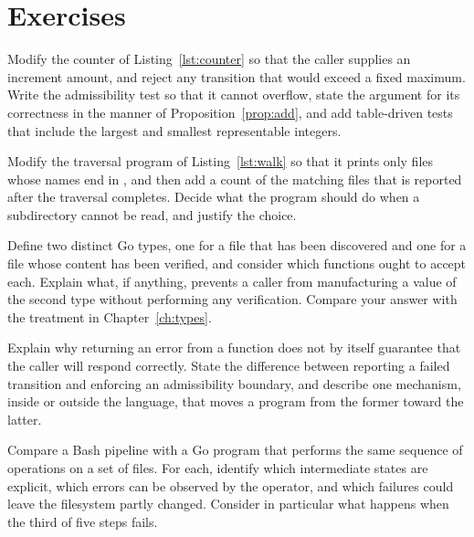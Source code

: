 \section*{Exercises}

\begin{exercise}
Modify the counter of Listing~\ref{lst:counter} so that the caller supplies an increment amount, and reject any transition that would exceed a fixed maximum. Write the admissibility test so that it cannot overflow, state the argument for its correctness in the manner of Proposition~\ref{prop:add}, and add table-driven tests that include the largest and smallest representable integers.
\end{exercise}

\begin{exercise}
Modify the traversal program of Listing~\ref{lst:walk} so that it prints only files whose names end in , and then add a count of the matching files that is reported after the traversal completes. Decide what the program should do when a subdirectory cannot be read, and justify the choice.
\end{exercise}

\begin{exercise}
Define two distinct Go types, one for a file that has been discovered and one for a file whose content has been verified, and consider which functions ought to accept each. Explain what, if anything, prevents a caller from manufacturing a value of the second type without performing any verification. Compare your answer with the treatment in Chapter~\ref{ch:types}.
\end{exercise}

\begin{exercise}
Explain why returning an error from a function does not by itself guarantee that the caller will respond correctly. State the difference between reporting a failed transition and enforcing an admissibility boundary, and describe one mechanism, inside or outside the language, that moves a program from the former toward the latter.
\end{exercise}

\begin{exercise}
Compare a Bash pipeline with a Go program that performs the same sequence of operations on a set of files. For each, identify which intermediate states are explicit, which errors can be observed by the operator, and which failures could leave the filesystem partly changed. Consider in particular what happens when the third of five steps fails.
\end{exercise}
